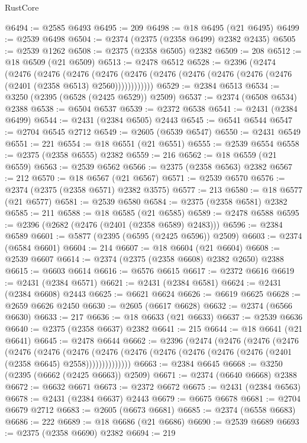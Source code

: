 \begin{lexlean}{RustCore}
\begin{coremodule}
@6494 := @2585 @6493
@6495 := 209
@6498 := @18 @6495 (@21 @6495)
@6499 := @2539 @6498
@6504 := @2374 (@2375 (@2358 @6499) @2382 @2435)
@6505 := @2539 @1262
@6508 := @2375 (@2358 @6505) @2382
@6509 := 208
@6512 := @18 @6509 (@21 @6509)
@6513 := @2478 @6512
@6528 := @2396
    (@2474
      (@2476
        (@2476
          (@2476
            (@2476 (@2476 (@2476 (@2476 (@2476 (@2476 (@2476 (@2401 (@2358 @6513) @2560))))))))))))
@6529 := @2384 @6513
@6534 := @3250 (@2395 (@6528 (@2425 @6529)) @2509)
@6537 := @2374 (@6508 @6534) @2388
@6538 := @6504 @6537
@6539 := @2372 @6538
@6541 := @2431 (@2384 @6499)
@6544 := @2431 (@2384 @6505) @2443
@6545 := @6541 @6544
@6547 := @2704 @6545 @2712
@6549 := @2605 (@6539 @6547)
@6550 := @2431 @6549
@6551 := 221
@6554 := @18 @6551 (@21 @6551)
@6555 := @2539 @6554
@6558 := @2375 (@2358 @6555) @2382
@6559 := 216
@6562 := @18 @6559 (@21 @6559)
@6563 := @2539 @6562
@6566 := @2375 (@2358 @6563) @2382
@6567 := 212
@6570 := @18 @6567 (@21 @6567)
@6571 := @2539 @6570
@6576 := @2374 (@2375 (@2358 @6571) @2382 @3575)
@6577 := 213
@6580 := @18 @6577 (@21 @6577)
@6581 := @2539 @6580
@6584 := @2375 (@2358 @6581) @2382
@6585 := 211
@6588 := @18 @6585 (@21 @6585)
@6589 := @2478 @6588
@6595 := @2396 (@2682 (@2476 (@2401 (@2358 @6589) @2483)))
@6596 := @2384 @6589
@6601 := @5877 (@2395 (@6595 (@2425 @6596)) @2509)
@6603 := @2374 (@6584 @6601)
@6604 := 214
@6607 := @18 @6604 (@21 @6604)
@6608 := @2539 @6607
@6614 := @2374 (@2375 (@2358 @6608) @2382 @2650) @2388
@6615 := @6603 @6614
@6616 := @6576 @6615
@6617 := @2372 @6616
@6619 := @2431 (@2384 @6571)
@6621 := @2431 (@2384 @6581)
@6624 := @2431 (@2384 @6608) @2443
@6625 := @6621 @6624
@6626 := @6619 @6625
@6628 := @2659 @6626 @2450
@6630 := @2605 (@6617 @6628)
@6632 := @2374 (@6566 @6630)
@6633 := 217
@6636 := @18 @6633 (@21 @6633)
@6637 := @2539 @6636
@6640 := @2375 (@2358 @6637) @2382
@6641 := 215
@6644 := @18 @6641 (@21 @6641)
@6645 := @2478 @6644
@6662 := @2396
    (@2474
      (@2476
        (@2476
          (@2476
            (@2476
              (@2476
                (@2476
                  (@2476 (@2476 (@2476 (@2476 (@2476 (@2476 (@2401 (@2358 @6645) @2558))))))))))))))
@6663 := @2384 @6645
@6668 := @3250 (@2395 (@6662 (@2425 @6663)) @2509)
@6671 := @2374 (@6640 @6668) @2388
@6672 := @6632 @6671
@6673 := @2372 @6672
@6675 := @2431 (@2384 @6563)
@6678 := @2431 (@2384 @6637) @2443
@6679 := @6675 @6678
@6681 := @2704 @6679 @2712
@6683 := @2605 (@6673 @6681)
@6685 := @2374 (@6558 @6683)
@6686 := 222
@6689 := @18 @6686 (@21 @6686)
@6690 := @2539 @6689
@6693 := @2375 (@2358 @6690) @2382
@6694 := 219

\end{coremodule}
\end{lexlean}
